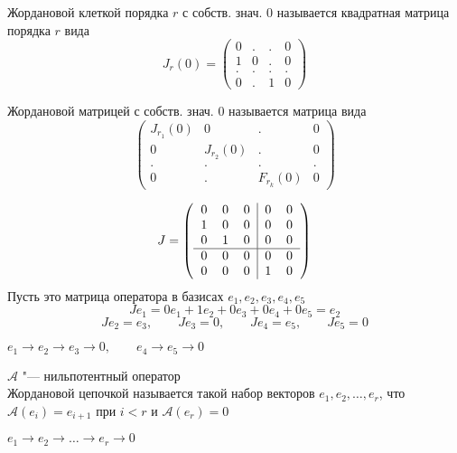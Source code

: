 \begin{definition}
	Жордановой клеткой порядка $ r $ с собств. знач. $ 0 $ называется квадратная матрица порядка $ r $ вида
	$$ J_r(0) =
	\begin{pmatrix}
		0 & . & . & 0 \\
		1 & 0 & . & 0 \\
		. & . & . & . \\
		0 & . & 1 & 0
	\end{pmatrix} $$
\end{definition}

\begin{definition}
	Жордановой матрицей с собств. знач. $ 0 $ называется матрица вида
	$$
	\begin{pmatrix}
		J_{r_1}(0) & 0 & . & 0 \\
		0 & J_{r_2}(0) & . & 0 \\
		. & . & . & . \\
		0 & . & F_{r_k}(0) & 0
	\end{pmatrix} $$
\end{definition}

\begin{eg}
	$$ J = \left(
	\begin{tabular}{c c c | c c}
		0 & 0 & 0 & 0 & 0 \\
		1 & 0 & 0 & 0 & 0 \\
		0 & 1 & 0 & 0 & 0 \\
		\hline
		0 & 0 & 0 & 0 & 0 \\
		0 & 0 & 0 & 1 & 0 \\
	\end{tabular} \right) $$
	Пусть это матрица оператора в базисах $ e_1, e_2, e_3, e_4, e_5 $
	$$ Je_1 = 0e_1 + 1e_2 + 0e_3 + 0e_4 + 0e_5 = e_2 $$
	$$ Je_2 = e_3, \qquad Je_3 = 0, \qquad Je_4 = e_5, \qquad Je_5 = 0 $$
\end{eg}

\begin{notation}
	$ e_1 \to e_2 \to e_3 \to 0, \qquad e_4 \to e_5 \to 0 $
\end{notation}

\begin{definition}
	$ \mathcal{A} $ "--- нильпотентный оператор \\
	Жордановой цепочкой называется такой набор векторов $ e_1, e_2, \dots, e_r $, что $ \mathcal{A}(e_i) = e_{i + 1} $ при $ i < r $ и $ \mathcal{A}(e_r) = 0 $
\end{definition}

\begin{notation}
	$ e_1 \to e_2 \to \dots \to e_r \to 0 $
\end{notation}

